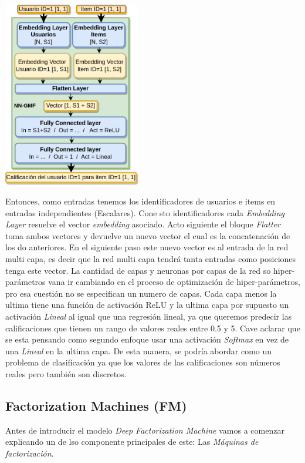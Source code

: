 \documentclass[11pt,a4paper,twoside]{thesis}
\begin{document}
\begin{center}
	\includegraphics[width=6cm]{./images/NN-MF.png}
\end{center}


Entonces, como entradas tenemos los identificadores de usuarios e items en entradas independientes (Escalares). Cone sto identificadores cada \textit{Embedding Layer} resuelve el vector \textit{embedding} asociado. Acto siguiente el bloque \textit{Flatter} toma ambos vectores y devuelve un nuevo vector el cual es la concatenación de los do anteriores. En el siguiente paso este nuevo vector es al entrada de la red multi capa, es decir que la red multi capa tendrá tanta entradas como posiciones tenga este vector. La cantidad de capas y neuronas por capas de la red so hiper-parámetros vana  ir cambiando en el proceso de optimización de hiper-parámetros, pro esa cuestión no se especifican un numero de capas. Cada capa menos la ultima tiene una función de activación ReLU y la ultima capa por supuesto un activación \textit{Lineal} al igual que una regresión lineal, ya que queremos predecir las calificaciones que tienen un rango de valores reales entre 0.5 y 5. Cave aclarar que se esta pensando como segundo enfoque usar una activación \textit{Softmax} en vez de una \textit{Lineal} en la ultima capa. De esta manera, se podría abordar como un problema de clasificación ya que los valores de las calificaciones son números reales pero también son discretos.


\subsection{Factorization Machines (FM)}


Antes de introducir el modelo \textit{Deep Factorization Machine} vamos a comenzar explicando un de lso componente principales de este: Las \textit{Máquinas de factorización}. 
\end{document}
